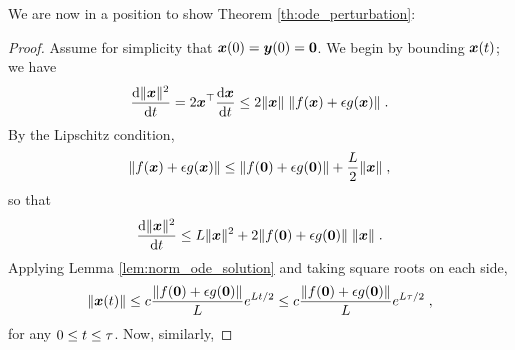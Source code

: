 We are now in a position to show Theorem \ref{th:ode_perturbation}:
\begin{proof}
    Assume for simplicity that 
    $\bm{x}(0) = \bm{y}(0) = \bm{0}$. We begin by bounding 
    $\bm{x} (t) $; we have
      \begin{equation}
        \nonumber
        \dv{\lVert \bm{x}\rVert^2}{t}  = 2  \bm{x}^\top  \dv{\bm{x}}{t}   \leq 2  \lVert \bm{x} \rVert  \; \lVert f( \bm{x} ) + \epsilon g( \bm{x} ) \rVert \;.
    \end{equation}
    By the Lipschitz condition,
     \begin{equation}
    \nonumber
        \lVert f( \bm{x} ) + \epsilon g( \bm{x} ) \rVert \leq \lVert f( \bm{0} ) + \epsilon g( \bm{0} ) \rVert + \frac{L}{2} \lVert \bm{x} \rVert \;,
    \end{equation}
    so that
    \begin{equation}
    \nonumber
       \dv{\lVert \bm{x}\rVert^2}{t} \leq L \lVert \bm{x} \rVert^2 + 2 \lVert f ( \bm{0} ) + \epsilon g( \bm{0} ) \rVert \; \lVert \bm{x} \rVert   \;.
    \end{equation}
    Applying Lemma \ref{lem:norm_ode_solution} and taking square roots on each side,
       \begin{equation}
    \label{eq:bound_norm_x}
        \lVert \bm{x} (t) \rVert \leq c\frac{\lVert f( \bm{0} ) + \epsilon g( \bm{0} ) \rVert }{L} e^{Lt/2} \leq c\frac{\lVert f( \bm{0} ) + \epsilon g( \bm{0} ) \rVert }{L} e^{L\tau/2} \;,
    \end{equation}
    for any $0 \leq t \leq \tau$. Now, similarly,

\end{proof}
